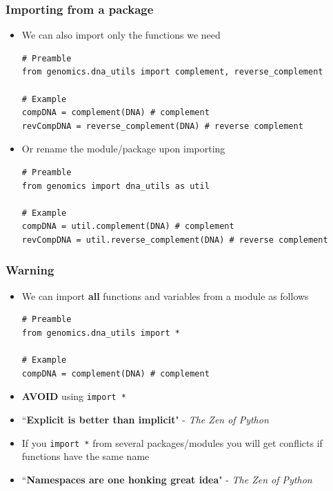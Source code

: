 \documentclass[pdf]{beamer}
\begin{document}
\begin{frame}[fragile]
\frametitle{Importing from a package}

\begin{itemize}

\item<1-> We can also import only the functions we need
\begin{lstlisting}[style=python]
# Preamble
from genomics.dna_utils import complement, reverse_complement

# Example
compDNA = complement(DNA) # complement
revCompDNA = reverse_complement(DNA) # reverse complement
\end{lstlisting}

\item<2-> Or rename the module/package upon importing
\begin{lstlisting}[style=python]
# Preamble
from genomics import dna_utils as util

# Example
compDNA = util.complement(DNA) # complement
revCompDNA = util.reverse_complement(DNA) # reverse complement
\end{lstlisting}

\end{itemize}

\end{frame}

\begin{frame}[fragile]
\frametitle{Warning}

\begin{itemize}\addtolength{\itemsep}{0.8\baselineskip}

\item <1-> We can import \textbf{all} functions and variables from a module as follows
\begin{lstlisting}[style=python]
# Preamble
from genomics.dna_utils import *

# Example
compDNA = complement(DNA) # complement
\end{lstlisting}
\vspace{-0.7cm}
\item<2-> \textbf{AVOID} using \texttt{import *}

\item<3-> ``\textbf{Explicit is better than implicit}" - {\scriptsize \textit{The Zen of Python}}

\item<4-> If you \texttt{import *} from several packages/modules you will get conflicts
if functions have the same name 

\item<5-> ``\textbf{Namespaces are one honking great idea}" - {\scriptsize \textit{The Zen of Python}}

\end{itemize}

\end{frame}
\end{document}
